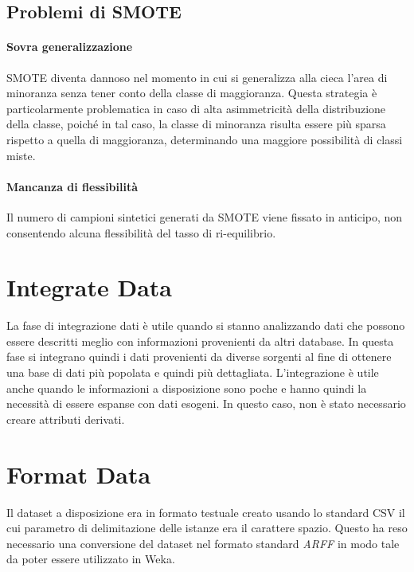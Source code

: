 \subsection{Problemi di SMOTE}
\paragraph{Sovra generalizzazione}
SMOTE diventa dannoso nel momento in cui si generalizza alla cieca l'area di minoranza senza tener conto della classe di maggioranza. Questa strategia è particolarmente problematica in caso di alta asimmetricità della distribuzione della classe, poiché in tal caso, la classe di minoranza risulta essere più sparsa rispetto a quella di maggioranza, determinando una maggiore possibilità di classi miste.

\paragraph{Mancanza di flessibilità}
Il numero di campioni sintetici generati da SMOTE viene fissato in anticipo, non consentendo alcuna flessibilità del tasso di ri-equilibrio.

\section{Integrate Data}
La fase di integrazione dati è utile quando si stanno analizzando dati che possono essere descritti meglio con informazioni provenienti da altri database. In questa fase si integrano quindi i dati provenienti da diverse sorgenti al fine di ottenere una base di dati più popolata e quindi più dettagliata. L'integrazione è utile anche quando le informazioni a disposizione sono poche e hanno quindi la necessità di essere espanse con dati esogeni.
In questo caso, non è stato necessario creare attributi derivati.

\section{Format Data}
Il dataset a disposizione era in formato testuale creato usando lo standard CSV il cui parametro di delimitazione delle istanze era il carattere spazio. Questo ha reso necessario una conversione del dataset nel formato standard \emph{ARFF} in modo tale da poter essere utilizzato in Weka.
